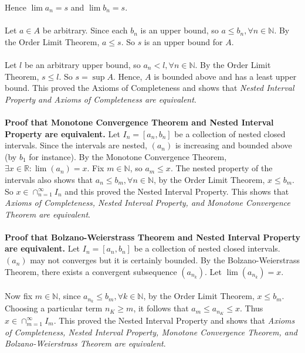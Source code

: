 \documentclass{article}
\begin{document}
            Hence $\lim{a_n}=s$ and $\lim{b_n}=s$.\\ \\
            Let $a \in A$ be arbitrary. Since each $b_n$ is an upper bound, so $a \leq b_n, \forall n \in \mathbb{N}$. By the Order Limit Theorem, $a \leq s$. So $s$ is an upper bound for $A$.\\ \\
            Let $l$ be an arbitrary upper bound, so $a_n < l, \forall n \in \mathbb{N}$. By the Order Limit Theorem, $s \leq l$. So $s=\sup A$. Hence, $A$ is bounded above and has a least upper bound. This proved the Axioms of Completeness and shows that \textit{Nested Interval Property and Axioms of Completeness are equivalent}.\\ \\
            \textbf{Proof that Monotone Convergence Theorem and Nested Interval Property are equivalent.} Let $I_n = [a_n,b_n]$ be a collection of nested closed intervals. Since the intervals are nested, $(a_n)$ is increasing and bounded above (by $b_1$ for instance). By the Monotone Convergence Theorem, $\exists x \in \mathbb{R}:\lim(a_n)=x$. Fix $m \in \mathbb{N}$, so $a_m \leq x$. The nested property of the intervals also shows that $a_n \leq b_m, \forall n \in \mathbb{N}$, by the Order Limit Theorem, $x \leq b_m$. So $x \in \cap_{n=1}^\infty I_n$ and this proved the Nested Interval Property. This shows that \textit{Axioms of Completeness, Nested Interval Property, and Monotone Convergence Theorem are equivalent}.\\ \\
            \textbf{Proof that Bolzano-Weierstrass Theorem and Nested Interval Property are equivalent.} Let $I_n = [a_n,b_n]$ be a collection of nested closed intervals. $(a_n)$ may not converges but it is certainly bounded. By the Bolzano-Weierstrass Theorem, there exists a convergent subsequence $(a_{n_k})$. Let $\lim(a_{n_k})=x$. \\ \\
            Now fix $m \in \mathbb{N}$, since $a_{n_k} \leq b_m, \forall k \in \mathbb{N}$, by the Order Limit Theorem, $x \leq b_m$. Choosing a particular term $n_K \geq m$, it follows that $a_m \leq a_{n_K} \leq x$. Thus $x \in \cap_{m=1}^\infty I_m$. This proved the Nested Interval Property and shows that \textit{Axioms of Completeness, Nested Interval Property, Monotone Convergence Theorem, and Bolzano-Weierstrass Theorem are equivalent}.\\ \\
\end{document}
